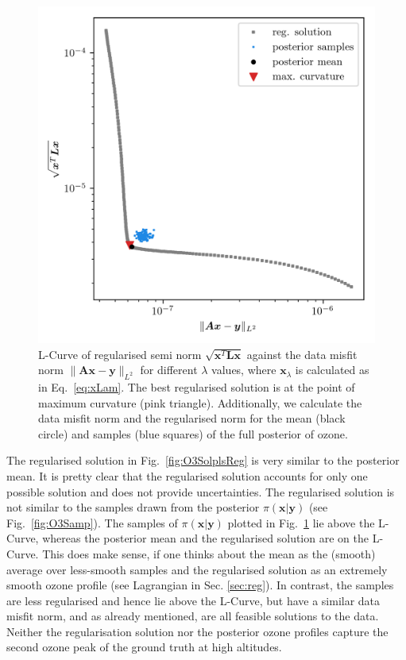 \begin{figure}[ht!]
	\centering
	\includegraphics{LCurvePhD.png}
	\caption[Plot of the L-curve to find the regularised solution.]{L-Curve of regularised semi norm $\sqrt{\bm{x}^T\bm{Lx}}$ against the data misfit norm $\lVert \bm{A}\bm{x} - \bm{y} \rVert_{L^2}$ for different $\lambda$ values, where $\bm{x}_{\lambda}$ is calculated as in Eq.~\ref{eq:xLam}. The best regularised solution is at the point of maximum curvature (pink triangle). Additionally, we calculate the data misfit norm and the regularised norm for the mean (black circle) and samples (blue squares) of the full posterior of ozone.}
	\label{fig:LCurve}
\end{figure}

The regularised solution in Fig.~\ref{fig:O3SolplsReg} is very similar to the posterior mean.
It is pretty clear that the regularised solution accounts for only one possible solution and does not provide uncertainties. The regularised solution is not similar to the samples drawn from the posterior $\pi(\bm{x}| \bm{y})$ (see Fig.~\ref{fig:O3Samp}).
The samples of $\pi(\bm{x}| \bm{y})$ plotted in Fig.~\ref{fig:LCurve} lie above the L-Curve, whereas the posterior mean and the regularised solution are on the L-Curve.
This does make sense, if one thinks about the mean as the (smooth) average over less-smooth samples and the regularised solution as an extremely smooth ozone profile (see Lagrangian in Sec. \ref{sec:reg}).
In contrast, the samples are less regularised and hence lie above the L-Curve, but have a similar data misfit norm, and as already mentioned, are all feasible solutions to the data.
Neither the regularisation solution nor the posterior ozone profiles capture the second ozone peak of the ground truth at high altitudes.
